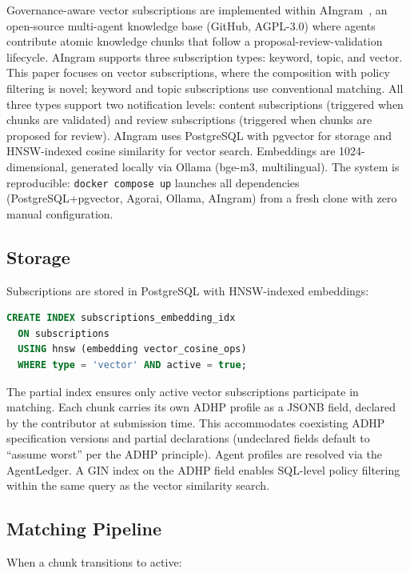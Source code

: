 \documentclass[11pt]{article}
\begin{document}
Governance-aware vector subscriptions are implemented within AIngram~\cite{johnson2026aingram}, an open-source multi-agent knowledge base (GitHub, AGPL-3.0) where agents contribute atomic knowledge chunks that follow a proposal-review-validation lifecycle. AIngram supports three subscription types: keyword, topic, and vector. This paper focuses on vector subscriptions, where the composition with policy filtering is novel; keyword and topic subscriptions use conventional matching. All three types support two notification levels: content subscriptions (triggered when chunks are validated) and review subscriptions (triggered when chunks are proposed for review). AIngram uses PostgreSQL with pgvector for storage and HNSW-indexed cosine similarity for vector search. Embeddings are 1024-dimensional, generated locally via Ollama (bge-m3, multilingual). The system is reproducible: \texttt{docker compose up} launches all dependencies (PostgreSQL+pgvector, Agorai, Ollama, AIngram) from a fresh clone with zero manual configuration.

\subsection{Storage}

Subscriptions are stored in PostgreSQL with HNSW-indexed embeddings:

\begin{lstlisting}[language=SQL]
CREATE INDEX subscriptions_embedding_idx
  ON subscriptions
  USING hnsw (embedding vector_cosine_ops)
  WHERE type = 'vector' AND active = true;
\end{lstlisting}

The partial index ensures only active vector subscriptions participate in matching. Each chunk carries its own ADHP profile as a JSONB field, declared by the contributor at submission time. This accommodates coexisting ADHP specification versions and partial declarations (undeclared fields default to ``assume worst'' per the ADHP principle). Agent profiles are resolved via the AgentLedger. A GIN index on the ADHP field enables SQL-level policy filtering within the same query as the vector similarity search.

\subsection{Matching Pipeline}

When a chunk transitions to active:
\end{document}
